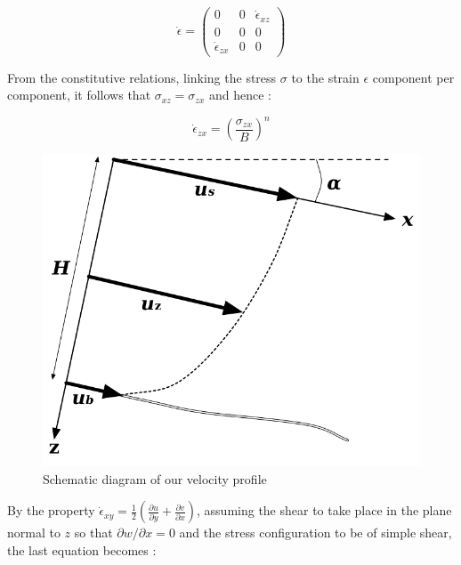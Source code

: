 \begin{equation} \dot{\epsilon} = \left( \begin{array}{ccc}
0 & 0 & \dot{\epsilon}_{xz} \\
0 & 0 & 0 \\
\dot{\epsilon}_{zx} & 0 & 0
\end{array} \right) \end{equation}

From the constitutive relations, linking the stress $\sigma$ to the strain $\epsilon$ component per component, it follows that $\sigma_{xz} = \sigma_{zx}$ and hence :

\begin{equation}\dot{\epsilon}_{zx} = \left( \frac{\sigma_{zx}}{B} \right)^n\end{equation}


\begin{figure}
	\begin{center}
		\includegraphics[scale=0.7]{VelocityProfile}
		\caption{Schematic diagram of our velocity profile}
		\label{velocities}
	\end{center}
\end{figure}

By the property $\dot{\epsilon}_{xy} = \frac{1}{2} \left( \frac{\partial u}{\partial y} + \frac{\partial v}{\partial x}\right)$, assuming the shear to take place in the plane normal to $z$ so that $\partial w / \partial x = 0$ and the stress configuration to be of simple shear, the last equation becomes :

